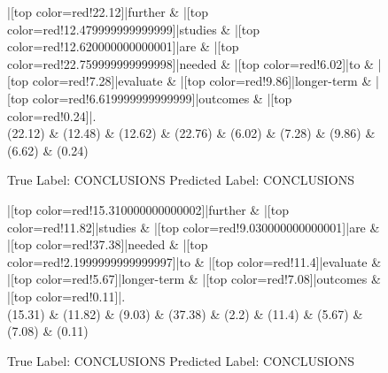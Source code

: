 \documentclass[a4paper, landscape]{article}
\begin{document}
\begin{figure}
\begin{center}
\begin{dependency}
\begin{deptext}
|[top color=red!22.12]|further \& |[top color=red!12.479999999999999]|studies \& |[top color=red!12.620000000000001]|are \& |[top color=red!22.759999999999998]|needed \& |[top color=red!6.02]|to \& |[top color=red!7.28]|evaluate \& |[top color=red!9.86]|longer-term \& |[top color=red!6.619999999999999]|outcomes \& |[top color=red!0.24]|.\\
(22.12) \& (12.48) \& (12.62) \& (22.76) \& (6.02) \& (7.28) \& (9.86) \& (6.62) \& (0.24)\\
\end{deptext}
\end{dependency}
\end{center}
\caption{True Label: CONCLUSIONS Predicted Label: CONCLUSIONS}
\end{figure}
\clearpage
\begin{figure}
\begin{center}
\begin{dependency}
\begin{deptext}
|[top color=red!15.310000000000002]|further \& |[top color=red!11.82]|studies \& |[top color=red!9.030000000000001]|are \& |[top color=red!37.38]|needed \& |[top color=red!2.1999999999999997]|to \& |[top color=red!11.4]|evaluate \& |[top color=red!5.67]|longer-term \& |[top color=red!7.08]|outcomes \& |[top color=red!0.11]|.\\
(15.31) \& (11.82) \& (9.03) \& (37.38) \& (2.2) \& (11.4) \& (5.67) \& (7.08) \& (0.11)\\
\end{deptext}
\end{dependency}
\end{center}
\caption{True Label: CONCLUSIONS Predicted Label: CONCLUSIONS}
\end{figure}
\end{document}
